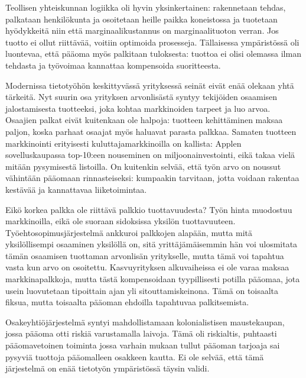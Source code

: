 \documentclass[nobib,finnish,oneside,openany,notoc,a4paper]{tufte-book}
\begin{document}
Teollisen yhteiskunnan logiikka oli hyvin yksinkertainen: rakennetaan
tehdas, palkataan henkilökunta ja osoitetaan heille paikka koneistossa
ja tuotetaan hyödykkeitä niin että marginaalikustannus on
marginaalituoton verran. Jos tuotto ei ollut riittävää, voitiin
optimoida prosesseja. Tällaisessa ympäristössä oli luontevaa, että
pääoma myös palkitaan tuloksesta: tuottoa ei olisi olemassa ilman
tehdasta ja työvoimaa kannattaa kompensoida suoritteesta.

Modernissa tietotyöhön keskittyvässä yrityksessä seinät eivät enää
olekaan yhtä tärkeitä. Nyt suurin osa yrityksen arvonlisästä syntyy
tekijöiden osaamisen jalostamisesta tuotteeksi, joka kohtaa markkinoiden
tarpeet ja luo arvoa. Osaajien palkat eivät kuitenkaan ole halpoja:
tuotteen kehittäminen maksaa paljon, koska parhaat osaajat myös haluavat
parasta palkkaa. Samaten tuotteen markkinointi erityisesti
kuluttajamarkkinoilla on kallista: Applen sovelluskaupassa top-10:een
nouseminen on miljoonainvestointi, eikä takaa vielä mitään pysymisestä
listoilla. On kuitenkin selvää, että työn arvo on noussut vähintään
pääomaan rinnasteiseksi: kumpaakin tarvitaan, jotta voidaan rakentaa
kestävää ja kannattavaa liiketoimintaa.

Eikö korkea palkka ole riittävä palkkio tuottavuudesta? Työn hinta
muodostuu markkinoilla, eikä ole suoraan sidoksissa yksilön
tuottavuuteen. Työehtosopimusjärjestelmä ankkuroi palkkojen alapään, mutta mitä yksilöllisempi osaaminen yksilöllä on, sitä
yrittäjämäisemmin hän voi ulosmitata tämän osaamisen tuottaman
arvonlisän yritykselle, mutta tämä voi tapahtua vasta kun arvo on
osoitettu. Kasvuyrityksen alkuvaiheissa ei ole varaa maksaa
markkinapalkkoja, mutta tästä kompensoidaan tyypillisesti potilla
pääomaa, jota usein luovutetaan tipoittain ajan yli sitouttamiskeinona.
Tämä on toisaalta fiksua, mutta toisaalta pääoman ehdoilla tapahtuvaa
palkitsemista.

Osakeyhtiöjärjestelmä syntyi mahdollistamaan kolonialistisen
maustekaupan, jossa pääoma otti riskiä varustamalla laivoja. Tämä oli
riskialtis, puhtaasti pääomavetoinen toiminta jossa varhain mukaan
tullut pääoman tarjoaja sai pysyviä tuottoja pääomalleen osakkeen
kautta. Ei ole selvää, että tämä järjestelmä on enää tietotyön
ympäristössä täysin validi.
\end{document}
